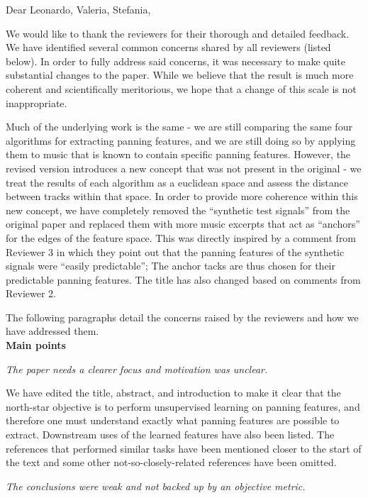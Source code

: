\documentclass{letter}
\begin{document}
\begin{letter}{}

\opening{Dear Leonardo, Valeria, Stefania,}

We would like to thank the reviewers for their thorough and detailed feedback. We have identified several common concerns shared by all reviewers (listed below). In order to fully address said concerns, it was necessary to make quite substantial changes to the paper. While we believe that the result is much more coherent and scientifically meritorious, we hope that a change of this scale is not inappropriate. 

Much of the underlying work is the same - we are still comparing the same four algorithms for extracting panning features, and we are still doing so by applying them to music that is known to contain specific panning features. However, the revised version introduces a new concept that was not present in the original - we treat the results of each algorithm as a euclidean space and assess the distance between tracks within that space. In order to provide more coherence within this new concept, we have completely removed the \enquote{synthetic test signals} from the original paper and replaced them with more music excerpts that act as \enquote{anchors} for the edges of the feature space. This was directly inspired by a comment from Reviewer 3 in which they point out that the panning features of the synthetic signals were \enquote{easily predictable}; The anchor tacks are thus chosen for their predictable panning features. The title has also changed based on comments from Reviewer 2.

The following paragraphs detail the concerns raised by the reviewers and how we have addressed them.
\bigskip\\
\filbreak
{\bf Main points}

\begin{displayquote}
    \it
    The paper needs a clearer focus and motivation was unclear.
\end{displayquote}

We have edited the title, abstract, and introduction to make it clear that the north-star objective is to perform unsupervised learning on panning features, and therefore one must understand exactly what panning features are possible to extract. Downstream uses of the learned features have also been listed. The references that performed similar tasks have been mentioned closer to the start of the text and some other not-so-closely-related references have been omitted.
\\
\filbreak
\begin{displayquote}
    \it
    The conclusions were weak and not backed up by an objective metric.
\end{displayquote}


\end{letter}
\end{document}
